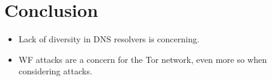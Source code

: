\section{Conclusion}
\label{sec:conclusion}
\begin{itemize}
	\item Lack of diversity in DNS resolvers is concerning.
	\item WF attacks are a concern for the Tor network, even more so when
	considering \name attacks. 
\end{itemize}
